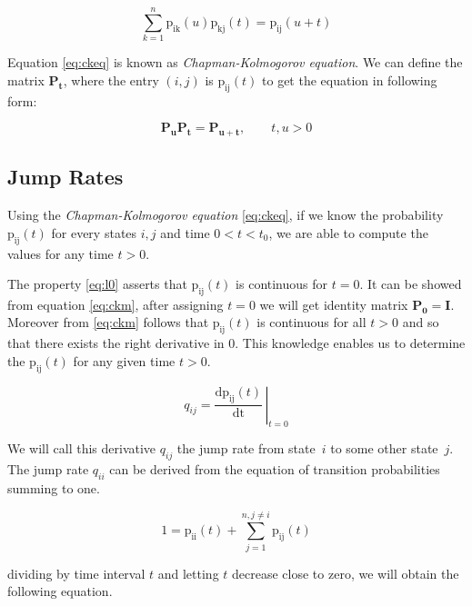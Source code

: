 \documentclass[thesis=M,english]{FITthesis}[2012/10/20]
\newcommand{\matr}[1]{\mathbf{#1}}
\begin{document}
\begin{equation}\label{eq:ckeq}
\sum_{k = 1}^n\mathrm{p_{ik}}(u)\mathrm{p_{kj}}(t) = \mathrm{p_{ij}}(u+t)     
\end{equation}

Equation \eqref{eq:ckeq} is known as \textit{Chapman-Kolmogorov equation}. 
We can define the matrix $\matr{P_t}$, where the entry $(i,j)$ is $\mathrm{p_{ij}}(t)$ to get the equation in following form:

\begin{equation}\label{eq:ckm}
\matr{P_u} \matr{P_t} = \matr{P_{u+t}},   \qquad t,u > 0  
\end{equation}

\subsection{ Jump Rates }

Using the \textit{Chapman-Kolmogorov equation} \eqref{eq:ckeq}, if we know the probability $\mathrm{p_{ij}}(t)$ for every states $i,j$ and time $0 < t < t_0$, we are able to compute the values for any time $t > 0$. 

The property \eqref{eq:l0}  asserts that $\mathrm{p_{ij}}(t)$ is continuous for $t=0$. It can be showed from equation \eqref{eq:ckm}, after assigning $t=0$ we will get identity matrix $\matr{P_0} = \matr{I}$.
Moreover from \eqref{eq:ckm} follows that $\mathrm{p_{ij}}(t)$ is continuous for all $t>0$ \cite{Ka81} and so that there exists the right derivative in 0. This knowledge enables us to determine the $\mathrm{p_{ij}}(t)$ for any given time $t>0$.   

\begin{equation}
q_{ij} =  \left.\frac{\mathrm{d}\mathrm{p_{ij}}(t)}{\mathrm{dt}} \,\right|_{t=0} 
\end{equation}



We will call this derivative $q_{ij}$ the jump rate from state~$i$ to some other state~$j$. The jump rate $q_{ii}$ can be derived from the equation of transition probabilities summing to one.

\begin{equation}
1 = \mathrm{p_{ii}}(t) + \sum_{j = 1}^{ n ,j \neq i} \mathrm{p_{ij}}(t) 
\end{equation}

dividing by time interval $t$ and letting $t$ decrease close to zero, we will obtain the following equation. 
\end{document}
